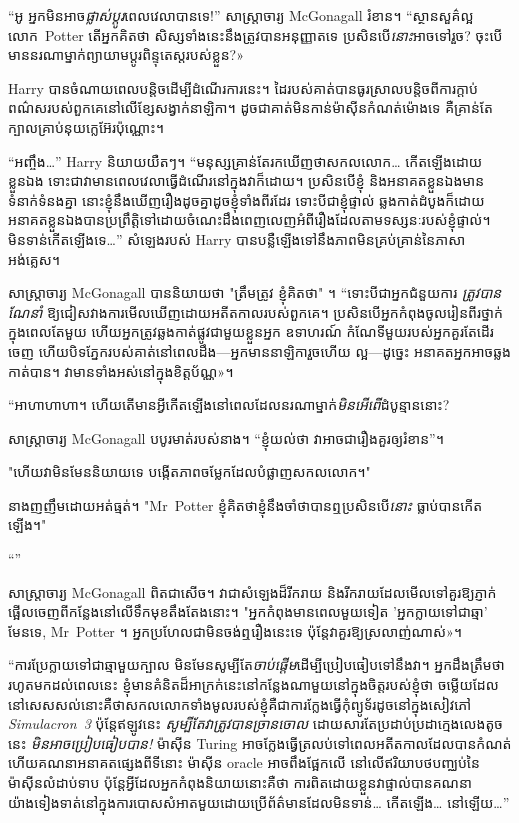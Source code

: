 {“អូ អ្នកមិនអាច\emph{ផ្លាស់ប្តូរ}ពេលវេលាបានទេ!” សាស្រ្តាចារ្យ McGonagall រំខាន។ “ស្ថានសួគ៌ល្អ លោក~Potter តើអ្នកគិតថា សិស្សទាំងនេះនឹងត្រូវបានអនុញ្ញាតទេ ប្រសិនបើ\emph{នោះ}អាចទៅរួច? ចុះ​បើ​មាន​នរណា​ម្នាក់​ព្យាយាម​ប្ដូរ​ពិន្ទុ​តេស្ត​របស់​ខ្លួន?»

Harry បានចំណាយពេលបន្តិចដើម្បីដំណើរការនេះ។ ដៃរបស់គាត់បានធូរស្រាលបន្តិចពីការក្តាប់ពណ៌សរបស់ពួកគេនៅលើខ្សែសង្វាក់នាឡិកា។ ដូចជា​គាត់​មិន​កាន់​ម៉ាស៊ីន​កំណត់​ម៉ោង​ទេ គឺ​គ្រាន់​តែ​ក្បាល​គ្រាប់​នុយក្លេអ៊ែរ​ប៉ុណ្ណោះ។

“អញ្ចឹង…” Harry និយាយយឺតៗ។ “មនុស្សគ្រាន់តែរកឃើញថាសកលលោក… កើតឡើងដោយខ្លួនឯង ទោះជាវាមានពេលវេលាធ្វើដំណើរនៅក្នុងវាក៏ដោយ។ ប្រសិនបើខ្ញុំ និងអនាគតខ្លួនឯងមានទំនាក់ទំនងគ្នា នោះខ្ញុំនឹងឃើញរឿងដូចគ្នាដូចខ្ញុំទាំងពីរដែរ ទោះបីជាខ្ញុំផ្ទាល់ ឆ្លងកាត់ដំបូងក៏ដោយ អនាគតខ្លួនឯងបានប្រព្រឹត្តិទៅដោយចំណេះដឹងពេញលេញអំពីរឿងដែលតាមទស្សនៈរបស់ខ្ញុំផ្ទាល់។ មិន​ទាន់​កើត​ឡើង​ទេ…” សំឡេង​របស់ Harry បាន​បន្លឺ​ឡើង​ទៅ​នឹង​ភាព​មិន​គ្រប់​គ្រាន់​នៃ​ភាសា​អង់គ្លេស។

សាស្រ្តាចារ្យ McGonagall បាននិយាយថា "ត្រឹមត្រូវ ខ្ញុំគិតថា" ។ “ទោះបីជាអ្នកជំនួយការ \emph{ត្រូវបានណែនាំ} ឱ្យជៀសវាងការមើលឃើញដោយអតីតកាលរបស់ពួកគេ។ ប្រសិនបើអ្នកកំពុងចូលរៀនពីរថ្នាក់ក្នុងពេលតែមួយ ហើយអ្នកត្រូវឆ្លងកាត់ផ្លូវជាមួយខ្លួនអ្នក ឧទាហរណ៍ កំណែទីមួយរបស់អ្នកគួរតែដើរចេញ ហើយបិទភ្នែករបស់គាត់នៅពេលដឹង—អ្នកមាននាឡិការួចហើយ ល្អ—ដូច្នេះ អនាគតអ្នកអាចឆ្លងកាត់បាន។ វា​មាន​ទាំង​អស់​នៅ​ក្នុង​ខិត្តប័ណ្ណ»។

“អាហាហាហា។ ហើយតើមានអ្វីកើតឡើងនៅពេលដែលនរណាម្នាក់\emph{មិនអើពើ}ដំបូន្មាននោះ?

សាស្ត្រាចារ្យ McGonagall បបូរមាត់របស់នាង។ “ខ្ញុំយល់ថា វាអាចជារឿងគួរឲ្យរំខាន”។

"ហើយវាមិនមែននិយាយទេ បង្កើតភាពចម្លែកដែលបំផ្លាញសកលលោក។"

នាងញញឹមដោយអត់ធ្មត់។ "Mr~Potter ខ្ញុំគិតថាខ្ញុំនឹងចាំថាបានឮប្រសិនបើ\emph{នោះ} ធ្លាប់បានកើតឡើង។"

“”

សាស្រ្តាចារ្យ McGonagall ពិតជាសើច។ វា​ជា​សំឡេង​ដ៏​រីករាយ និង​រីករាយ​ដែល​មើលទៅ​គួរឱ្យ​ភ្ញាក់ផ្អើល​ចេញពី​កន្លែង​នៅលើ​ទឹកមុខ​តឹងតែង​នោះ។ "អ្នក​កំពុង​មាន​ពេល​មួយ​ទៀត 'អ្នក​ក្លាយ​ទៅ​ជា​ឆ្មា' មែន​ទេ, Mr~Potter ។ អ្នក​ប្រហែល​ជា​មិន​ចង់​ឮ​រឿង​នេះ​ទេ ប៉ុន្តែ​វា​គួរ​ឱ្យ​ស្រលាញ់​ណាស់»។

“ការប្រែក្លាយទៅជាឆ្មាមួយក្បាល មិនមែនសូម្បីតែ\emph{ចាប់ផ្តើម}ដើម្បីប្រៀបធៀបទៅនឹងវា។ អ្នកដឹងត្រឹមថារហូតមកដល់ពេលនេះ ខ្ញុំមានគំនិតដ៏អាក្រក់នេះនៅកន្លែងណាមួយនៅក្នុងចិត្តរបស់ខ្ញុំថា ចម្លើយដែលនៅសេសសល់នោះគឺថាសកលលោកទាំងមូលរបស់ខ្ញុំគឺជាការក្លែងធ្វើកុំព្យូទ័រដូចនៅក្នុងសៀវភៅ \emph{Simulacron~3} ប៉ុន្តែឥឡូវនេះ \emph{សូម្បីតែវាត្រូវបានច្រានចោល} ដោយសារតែប្រដាប់ប្រដាក្មេងលេងតូចនេះ \emph{មិនអាចប្រៀបធៀបបាន!} ម៉ាស៊ីន Turing អាចក្លែងធ្វើត្រលប់ទៅពេលអតីតកាលដែលបានកំណត់ ហើយគណនាអនាគតផ្សេងពីទីនោះ ម៉ាស៊ីន oracle អាចពឹងផ្អែកលើ នៅលើឥរិយាបថបញ្ឈប់នៃម៉ាស៊ីនលំដាប់ទាប ប៉ុន្តែអ្វីដែលអ្នកកំពុងនិយាយនោះគឺថា ការពិតដោយខ្លួនវាផ្ទាល់បានគណនាយ៉ាងទៀងទាត់នៅក្នុងការបោសសំអាតមួយដោយប្រើព័ត៌មានដែលមិនទាន់… កើតឡើង… នៅឡើយ…”

}
